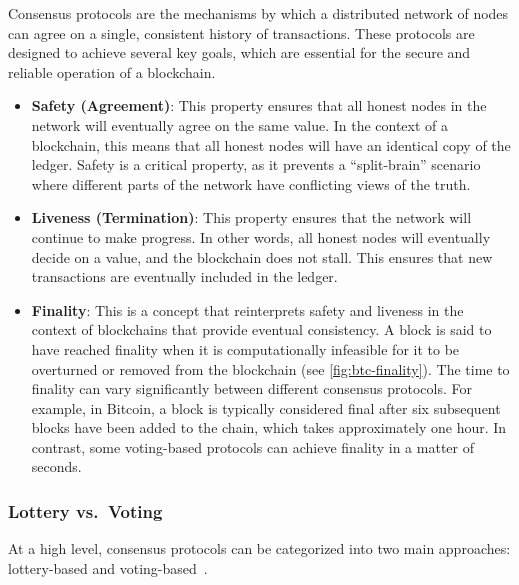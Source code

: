 Consensus protocols are the mechanisms by which a distributed network of
nodes can agree on a single, consistent history of transactions. These
protocols are designed to achieve several key goals, which are essential
for the secure and reliable operation of a blockchain.

\begin{itemize}
	\item
	\textbf{Safety (Agreement)}: This property ensures that all honest
	nodes in the network will eventually agree on the same value. In the
	context of a blockchain, this means that all honest nodes will have an
	identical copy of the ledger. Safety is a critical property, as it
	prevents a ``split-brain'' scenario where different parts of the
	network have conflicting views of the truth.
	\item
	\textbf{Liveness (Termination)}: This property ensures that the
	network will continue to make progress. In other words, all honest
	nodes will eventually decide on a value, and the blockchain does not
	stall. This ensures that new transactions are eventually included in
	the ledger.
	\item
	\textbf{Finality}: This is a concept that reinterprets safety and
	liveness in the context of blockchains that provide eventual
	consistency. A block is said to have reached finality when it is
	computationally infeasible for it to be overturned or removed from the
	blockchain (see \autoref{fig:btc-finality}). The time to finality can vary significantly between
	different consensus protocols. For example, in Bitcoin, a block is
	typically considered final after six subsequent blocks have been added
	to the chain, which takes approximately one hour. In contrast, some
	voting-based protocols can achieve finality in a matter of seconds.
\end{itemize}

\subsubsection{Lottery vs.~Voting}\label{lottery-vs.-voting}

At a high level, consensus protocols can be categorized into two main
approaches: lottery-based and voting-based~\cite{hyperledger1}.

